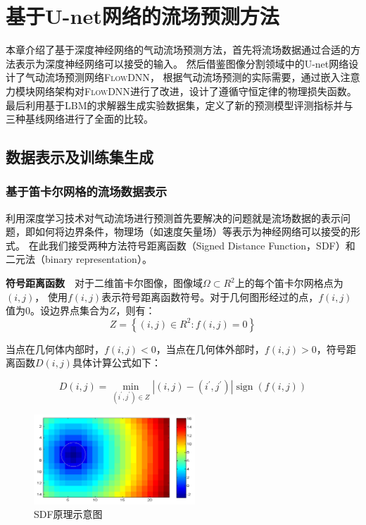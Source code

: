\chapter{基于U-net网络的流场预测方法}

本章介绍了基于深度神经网络的气动流场预测方法，首先将流场数据通过合适的方法表示为深度神经网络可以接受的输入。
然后借鉴图像分割领域中的U-net网络设计了气动流场预测网络\textsc{FlowDNN}，
根据气动流场预测的实际需要，通过嵌入注意力模块网络架构对\textsc{FlowDNN}进行了改进，设计了遵循守恒定律的物理损失函数。
最后利用基于LBM的求解器生成实验数据集，定义了新的预测模型评测指标并与三种基线网络进行了全面的比较。

\section{数据表示及训练集生成}

\subsection{基于笛卡尔网格的流场数据表示}
利用深度学习技术对气动流场进行预测首先要解决的问题就是流场数据的表示问题，即如何将边界条件，物理场（如速度矢量场）等表示为神经网络可以接受的形式。
在此我们接受两种方法符号距离函数（Signed Distance Function，SDF）和二元法（binary representation）。


\textbf{符号距离函数}~~对于二维笛卡尔图像，图像域$\Omega \subset R^{2}$上的每个笛卡尔网格点为$(i, j)$，
使用$f(i, j)$表示符号距离函数符号。对于几何图形经过的点，$f(i, j)$值为0。设边界点集合为$Z$，则有：
\begin{equation}Z=\left\{(i, j) \in R^{2}: f(i, j)=0\right\}\end{equation}

当点在几何体内部时，$f(i, j) < 0$，当点在几何体外部时，$f(i, j) > 0$，符号距离函数$D(i, j)$具体计算公式如下：

\begin{equation}
D(i, j)=\min _{\left(i^{\prime}, j^{\prime}\right) \in Z}\left|(i, j)-\left(i^{\prime}, j^{\prime}\right)\right| \operatorname{sign}(f(i, j))
\end{equation}


\begin{figure}[htp]
	\centering
	\includegraphics[width=0.54\textwidth]{figures/sdf.png}
	\caption{SDF原理示意图}
	\label{fig:sdf}
\end{figure}

